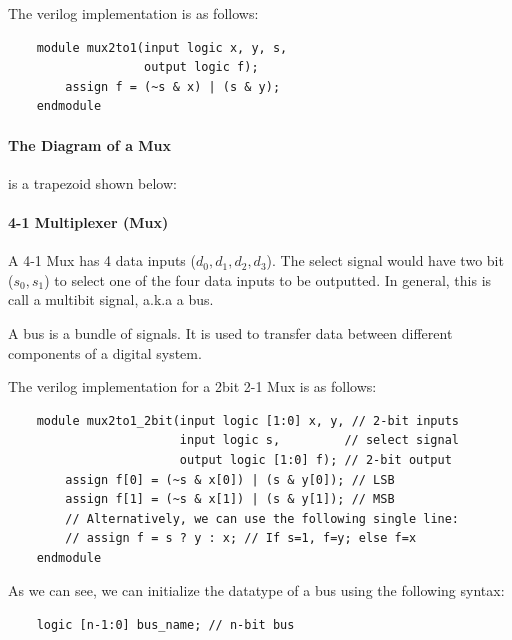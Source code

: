 \documentclass[11pt]{report}
\begin{document}
\begin{example}
    The verilog implementation is as follows:
    \begin{verbatim}
    module mux2to1(input logic x, y, s,
                   output logic f);
        assign f = (~s & x) | (s & y);
    endmodule
    \end{verbatim}
\end{example}

\paragraph{The Diagram of a Mux} is a trapezoid shown below:
\begin{center}
\end{center}

\paragraph{4-1 Multiplexer (Mux)} A 4-1 Mux has 4 data inputs ($d_0, d_1, d_2, d_3$). The select signal would have two bit ($s_0, s_1$) to select one of the four data inputs to be outputted. In general, this is call a multibit signal, a.k.a a bus.
\begin{definition}[Bus]
    A bus is a bundle of signals. It is used to transfer data between different components of a digital system.
\end{definition}

\begin{example}
    The verilog implementation for a 2bit 2-1 Mux is as follows:
    \begin{verbatim}
    module mux2to1_2bit(input logic [1:0] x, y, // 2-bit inputs
                        input logic s,         // select signal
                        output logic [1:0] f); // 2-bit output
        assign f[0] = (~s & x[0]) | (s & y[0]); // LSB
        assign f[1] = (~s & x[1]) | (s & y[1]); // MSB
        // Alternatively, we can use the following single line:
        // assign f = s ? y : x; // If s=1, f=y; else f=x
    endmodule
    \end{verbatim}

    As we can see, we can initialize the datatype of a bus using the following syntax:
    \begin{verbatim}
    logic [n-1:0] bus_name; // n-bit bus
    \end{verbatim}
    
\end{example}
\end{document}
